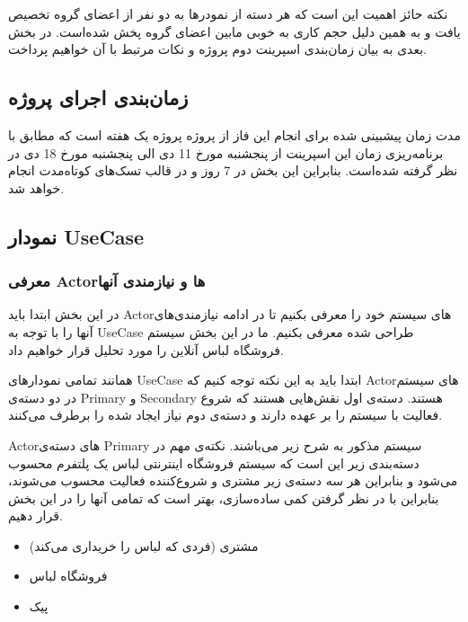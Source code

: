 \documentclass[]{article}
\begin{document}
نکته حائز اهمیت این است که هر دسته از نمودرها به دو نفر از اعضای گروه
تخصیص یافت و به همین دلیل حجم کاری به خوبی مابین اعضای گروه پخش شده‌است.
در بخش بعدی به بیان زمان‌بندی اسپرینت دوم پروژه و نکات مرتبط با آن
خواهیم پرداخت.

\subsection{زمان‌بندی اجرای
پروژه}\label{ux632ux645ux627ux646ux628ux646ux62fux6cc-ux627ux62cux631ux627ux6cc-ux67eux631ux648ux698ux647-1}

مدت زمان پیشبینی شده برای انجام این فاز از پروژه پروژه یک هفته است که
مطابق با برنامه‌ریزی زمان این اسپرینت از پنجشنبه مورخ 11 دی الی پنجشنبه
مورخ 18 دی در نظر گرفته شده‌است. بنابراین این بخش در 7 روز و در قالب
تسک‌های کوتاه‌مدت انجام خواهد شد.

\subsection{نمودار
UseCase}\label{ux646ux645ux648ux62fux627ux631-usecase}

\subsubsection{معرفی Actorها و نیازمندی
آنها}\label{ux645ux639ux631ux641ux6cc-actorux647ux627-ux648-ux646ux6ccux627ux632ux645ux646ux62fux6cc-ux622ux646ux647ux627}

در این بخش ابتدا باید Actorهای سیستم خود را معرفی بکنیم تا در ادامه
نیازمندی‌های آنها را با توجه به UseCase طراحی شده معرفی بکنیم. ما در این
بخش سیستم فروشگاه لباس آنلاین را مورد تحلیل قرار خواهیم داد.

همانند تمامی نمودارهای UseCase ابتدا باید به این نکته توجه کنیم که
Actorهای سیستم در دو دسته‌ی Primary و Secondary هستند. دسته‌ی اول
نقش‌هایی هستند که شروع فعالیت با سیستم را بر عهده دارند و دسته‌ی دوم
نیاز ایجاد شده را برطرف می‌کنند.

Actorهای دسته‌ی Primary سیستم مذکور به شرح زیر می‌باشند. نکته‌ی مهم در
دسته‌بندی زیر این است که سیستم فروشگاه اینترنتی لباس یک پلتفرم محسوب
می‌شود و بنابراین هر سه دسته‌ی زیر مشتری و شروع‌کننده فعالیت محسوب
می‌شوند، بنابراین با در نظر گرفتن کمی ساده‌سازی، بهتر است که تمامی آنها
را در این بخش قرار دهیم.

\begin{itemize}
\item
  مشتری (فردی که لباس را خریداری می‌کند)
\item
  فروشگاه لباس
\item
  پیک
\end{itemize}
\end{document}
